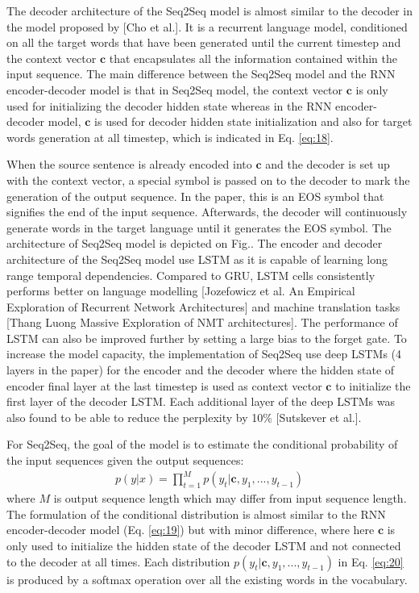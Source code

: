 \documentclass[12pt]{extarticle}
\begin{document}
\newpage %
The decoder architecture of the Seq2Seq model is almost similar to the decoder in the model proposed by [Cho et al.]. It is a recurrent language model, conditioned on all the target words that have been generated until the current timestep and the context vector $\textbf{c}$ that encapsulates all the information contained within the input sequence. The main difference between the Seq2Seq model and the RNN encoder-decoder model is that in Seq2Seq model, the context vector $\textbf{c}$ is only used for initializing the decoder hidden state whereas in the RNN encoder-decoder model, $\textbf{c}$ is used for decoder hidden state initialization and also for target words generation at all timestep, which is indicated in Eq. \ref{eq:18}. 

When the source sentence is already encoded into $\textbf{c}$ and the decoder is set up with the context vector, a special symbol is passed on to the decoder to mark the generation of the output sequence. In the paper, this is an EOS symbol that signifies the end of the input sequence. Afterwards, the decoder will continuously generate words in the target language until it generates the EOS symbol. The architecture of Seq2Seq model is depicted on Fig..
\newpage
The encoder and decoder architecture of the Seq2Seq model use LSTM as it is capable of learning long range temporal dependencies. Compared to GRU, LSTM cells consistently performs better on language modelling [Jozefowicz et al. An Empirical Exploration of Recurrent Network Architectures] and machine translation tasks [Thang Luong Massive Exploration of NMT architectures]. The performance of LSTM can also be improved further by setting a large bias to the forget gate. To increase the model capacity, the implementation of Seq2Seq use deep LSTMs (4 layers in the paper) for the encoder and the decoder where the hidden state of encoder final layer at the last timestep is used as context vector $\textbf{c}$ to initialize the first layer of the decoder LSTM. Each additional layer of the deep LSTMs was also found to be able to reduce the perplexity by 10\% [Sutskever et al.]. 

For Seq2Seq, the goal of the model is to estimate the conditional probability of the input sequences given the output sequences:
\begin{align}
p(y|x) = \prod_{t=1}^{M} p(y_{t} | \textbf{c}, y_{1},..., y_{t-1})  \label{eq:20}
\end{align}
where $M$ is output sequence length which may differ from input sequence length. The formulation of the conditional distribution is almost similar to the RNN encoder-decoder model (Eq. \ref{eq:19}) but with minor difference, where here $\textbf{c}$ is only used to initialize the hidden state of the decoder LSTM and not connected to the decoder at all times. Each distribution $p(y_{t} | \textbf{c}, y_{1},..., y_{t-1})$ in Eq. \ref{eq:20} is produced by a softmax operation over all the existing words in the vocabulary.
\end{document}
